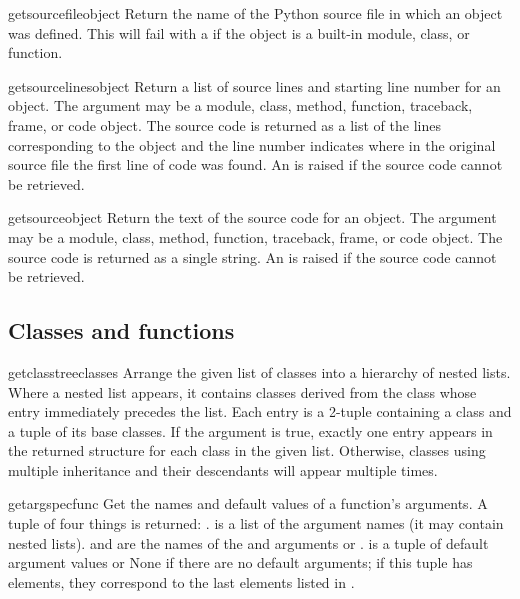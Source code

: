 \begin{funcdesc}{getsourcefile}{object}
  Return the name of the Python source file in which an object was
  defined.  This will fail with a  if the object
  is a built-in module, class, or function.
\end{funcdesc}

\begin{funcdesc}{getsourcelines}{object}
  Return a list of source lines and starting line number for an object.
  The argument may be a module, class, method, function, traceback, frame,
  or code object.  The source code is returned as a list of the lines
  corresponding to the object and the line number indicates where in the
  original source file the first line of code was found.  An
   is raised if the source code cannot be retrieved.
\end{funcdesc}

\begin{funcdesc}{getsource}{object}
  Return the text of the source code for an object.
  The argument may be a module, class, method, function, traceback, frame,
  or code object.  The source code is returned as a single string.  An
   is raised if the source code cannot be retrieved.
\end{funcdesc}

\subsection{Classes and functions
            \label{inspect-classes-functions}}

\begin{funcdesc}{getclasstree}{classes}
  Arrange the given list of classes into a hierarchy of nested lists.
  Where a nested list appears, it contains classes derived from the class
  whose entry immediately precedes the list.  Each entry is a 2-tuple
  containing a class and a tuple of its base classes.  If the 
  argument is true, exactly one entry appears in the returned structure
  for each class in the given list.  Otherwise, classes using multiple
  inheritance and their descendants will appear multiple times.
\end{funcdesc}

\begin{funcdesc}{getargspec}{func}
  Get the names and default values of a function's arguments.
  A tuple of four things is returned: .
   is a list of the argument names (it may contain nested lists).
   and  are the names of the \code{*} and
  \code{**} arguments or .
   is a tuple of default argument values or None if there are no
  default arguments; if this tuple has  elements, they correspond to
  the last  elements listed in .
\end{funcdesc}

